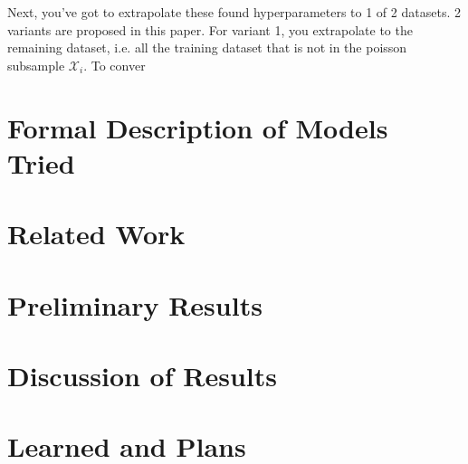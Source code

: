\documentclass{article}
\begin{document}
    Next, you've got to extrapolate these found hyperparameters to 1 of 2 datasets. 2 variants are proposed in this paper. For variant 1, you extrapolate to the 
    remaining dataset, i.e. all the training dataset that is not in the poisson subsample $\mathcal{X}_i$. To conver

    \section{Formal Description of Models Tried}\label{sec:models}

    \section{Related Work}\label{sec:related-work}

    \section{Preliminary Results}\label{sec:prelim-results}
 
    \section{Discussion of Results}\label{sec:results-discussion}

    \section{Learned and Plans}\label{sec:learned-and-plans}
    

    
    
\end{document}
